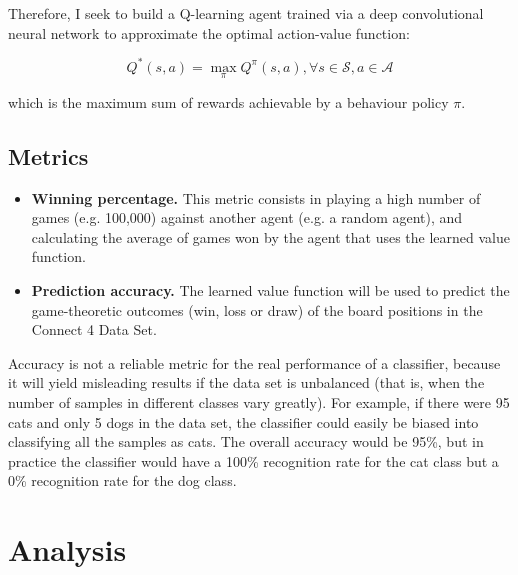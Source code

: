 \documentclass{article}
\begin{document}
Therefore, I seek to build a Q-learning agent trained via a deep convolutional neural network to
approximate the optimal action-value function:

\begin{equation}
Q^*(s,a) = \max\limits_\pi Q^\pi(s,a), \forall s \in \mathcal{S}, a \in \mathcal{A}
\end{equation}

\noindent which is the maximum sum of rewards achievable by a behaviour policy $\pi$.

\subsection{Metrics}

\begin{itemize}

    \item \textbf{Winning percentage.} This metric consists in playing a high number of games (e.g.
        100,000) against another agent (e.g. a random agent), and calculating the average of games
        won by the agent that uses the learned value function.
        
    \item \textbf{Prediction accuracy.} The learned value function will be used to predict the
        game-theoretic outcomes (win, loss or draw) of the board positions in the Connect 4 Data
        Set.

\end{itemize}


Accuracy is not a reliable metric for the real performance of a classifier, because it will yield
misleading results if the data set is unbalanced (that is, when the number of samples in different
classes vary greatly). For example, if there were 95 cats and only 5 dogs in the data set, the
classifier could easily be biased into classifying all the samples as cats. The overall accuracy
would be 95\%, but in practice the classifier would have a 100\% recognition rate for the cat class
but a 0\% recognition rate for the dog class.

\section{Analysis}
\end{document}
